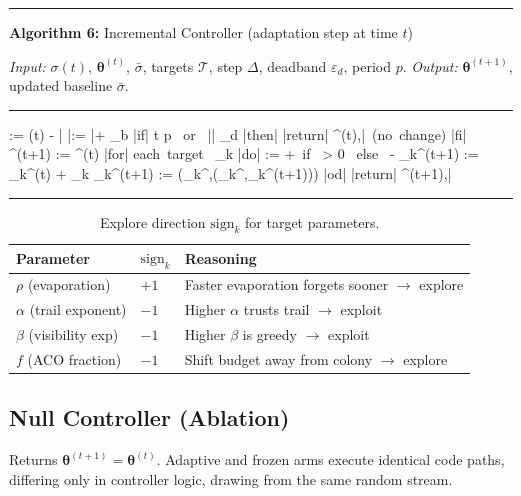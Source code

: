 \documentclass[11pt,a4paper]{article}
\theoremstyle{definition}
\begin{document}
\begin{center}
\begin{minipage}{0.88\linewidth}
\hrule\medskip
\textbf{Algorithm 6:} Incremental Controller (adaptation step at time $t$)

\smallskip\textit{Input:} $\sigma(t)$, $\bm{\theta}^{(t)}$, $\bar\sigma$,
targets $\mathcal{T}$, step $\Delta$, deadband $\varepsilon_d$, period $p$.
\textit{Output:} $\bm{\theta}^{(t+1)}$, updated baseline $\bar\sigma$.
\hrule\medskip
\begin{program}
\delta := \xi \cdot \sigma(t) - \bar\sigma
\bar\sigma := \bar\sigma + \alpha_b\cdot\delta
|if| t \bmod p  \mbox{ or } |\delta| \le \varepsilon_d |then|
  |return| \bm{\theta}^{(t)},\;\bar\sigma \mbox{ (no change)}
|fi|
\bm{\theta}^{(t+1)} := \bm{\theta}^{(t)}
|for| \mbox{each target } \theta_k\in{} |do|
   := +\Delta \mbox{ if } \delta > 0 \mbox{ else } -\Delta
  \theta_k^{(t+1)} := \theta_k^{(t)} + _k\cdot{}
  \theta_k^{(t+1)} := \min(\theta_k^{\max},\max(\theta_k^{\min},\theta_k^{(t+1)}))
|od|
|return| \bm{\theta}^{(t+1)},\;\bar\sigma
\end{program}
\hrule
\end{minipage}
\end{center}

\begin{table}[h]\centering
  \caption{Explore direction $\mathrm{sign}_k$ for target parameters.}
  \begin{tabular}{lll}
    \toprule Parameter & $\mathrm{sign}_k$ & Reasoning \\ \midrule
    $\rho$ (evaporation) & $+1$ & Faster evaporation forgets sooner $\to$ explore \\
    $\alpha$ (trail exponent) & $-1$ & Higher $\alpha$ trusts trail $\to$ exploit \\
    $\beta$ (visibility exp) & $-1$ & Higher $\beta$ is greedy $\to$ exploit \\
    $f$ (ACO fraction) & $-1$ & Shift budget away from colony $\to$ explore \\
    \bottomrule
  \end{tabular}
\end{table}

\subsection{Null Controller (Ablation)}

Returns $\bm{\theta}^{(t+1)}=\bm{\theta}^{(t)}$. Adaptive and frozen arms execute
identical code paths, differing only in controller logic, drawing from the same random
stream.
\end{document}
